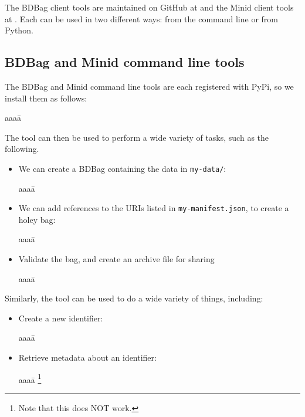 \documentclass[11pt]{article}
\begin{document}
The BDBag client tools are maintained on GitHub at  and the 
Minid client tools at .
Each can be used in two different ways: from the command line or from Python.

\subsection{BDBag and Minid command line tools} 

The BDBag and Minid command line tools are each registered with PyPi, 
so we install them as follows:
\vspace{-1ex}
\begin{tabbing}
aaaa\=\kill
\>\\
\>
\end{tabbing}

\noindent
The  tool can then be used to perform a wide variety of tasks, such as the following.
\begin{itemize}
\item
We can create a BDBag containing the data in \texttt{my-data/}:
\vspace{-2ex}
\begin{tabbing}
aaaa\=\kill
\>
\end{tabbing}

\item
We can add references to the URIs listed in \texttt{my-manifest.json}, to create a holey bag:
\vspace{-2ex}
\begin{tabbing}
aaaa\=\kill
\>
\end{tabbing}

\item
Validate the bag, and create an archive file for sharing
\vspace{-2ex}
\begin{tabbing}
aaaa\=\kill
\>
\end{tabbing}

\end{itemize}

\noindent
Similarly, the  tool can be used to do a wide variety of things, including:

\begin{itemize}
\item
Create a new identifier:
\vspace{-2ex}
\begin{tabbing}
aaaa\=\kill
\>
\end{tabbing}

\item
Retrieve metadata about an identifier:
\vspace{-2ex}
\begin{tabbing}
aaaa\=\kill
\>\footnote{Note that this does NOT work.}
\end{tabbing}
\end{itemize}
 
\end{document}
